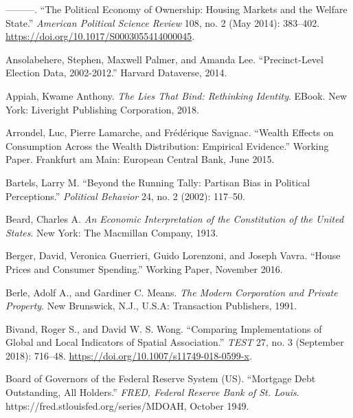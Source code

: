 \documentclass[12pt,oneside]{psthesis}
\begin{document}
\leavevmode\hypertarget{ref-ansellPoliticalEconomyOwnership2014a}{}%
---------. ``The Political Economy of Ownership: Housing Markets and the Welfare State.'' \emph{American Political Science Review} 108, no. 2 (May 2014): 383--402. \url{https://doi.org/10.1017/S0003055414000045}.

\leavevmode\hypertarget{ref-ansolabehere2014precinctlevel}{}%
Ansolabehere, Stephen, Maxwell Palmer, and Amanda Lee. ``Precinct-Level Election Data, 2002-2012.'' Harvard Dataverse, 2014.

\leavevmode\hypertarget{ref-appiah2018lies}{}%
Appiah, Kwame Anthony. \emph{The Lies That Bind: Rethinking Identity}. EBook. New York: Liveright Publishing Corporation, 2018.

\leavevmode\hypertarget{ref-arrondel2015wealth}{}%
Arrondel, Luc, Pierre Lamarche, and Frédérique Savignac. ``Wealth Effects on Consumption Across the Wealth Distribution: Empirical Evidence.'' Working Paper. Frankfurt am Main: European Central Bank, June 2015.

\leavevmode\hypertarget{ref-bartels2002running}{}%
Bartels, Larry M. ``Beyond the Running Tally: Partisan Bias in Political Perceptions.'' \emph{Political Behavior} 24, no. 2 (2002): 117--50.

\leavevmode\hypertarget{ref-beard1913economic}{}%
Beard, Charles A. \emph{An Economic Interpretation of the Constitution of the United States}. New York: The Macmillan Company, 1913.

\leavevmode\hypertarget{ref-berger2016house}{}%
Berger, David, Veronica Guerrieri, Guido Lorenzoni, and Joseph Vavra. ``House Prices and Consumer Spending.'' Working Paper, November 2016.

\leavevmode\hypertarget{ref-berle1991modern}{}%
Berle, Adolf A., and Gardiner C. Means. \emph{The Modern Corporation and Private Property}. New Brunswick, N.J., U.S.A: Transaction Publishers, 1991.

\leavevmode\hypertarget{ref-bivand2018comparing}{}%
Bivand, Roger S., and David W. S. Wong. ``Comparing Implementations of Global and Local Indicators of Spatial Association.'' \emph{TEST} 27, no. 3 (September 2018): 716--48. \url{https://doi.org/10.1007/s11749-018-0599-x}.

\leavevmode\hypertarget{ref-boardofgovernorsofthefederalreservesystemus1949mortgagec}{}%
Board of Governors of the Federal Reserve System (US). ``Mortgage Debt Outstanding, All Holders.'' \emph{FRED, Federal Reserve Bank of St. Louis}. https://fred.stlouisfed.org/series/MDOAH, October 1949.
\end{document}
